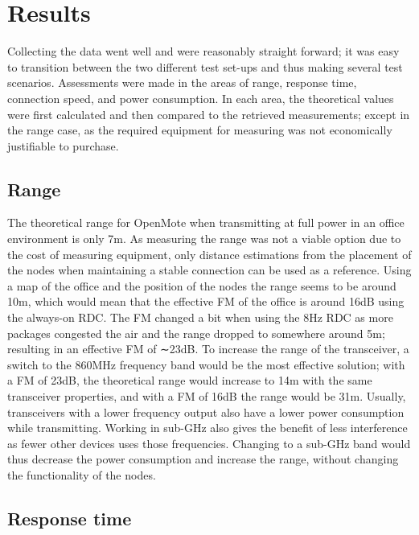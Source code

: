 \section{Results} \label{sec:Results}

Collecting the data went well and were reasonably straight forward;
	it was easy to transition between the two different test set-ups and thus making several test scenarios.
Assessments were made in the areas of range,
	response time,
	connection speed,
	and power consumption.
In each area,
	the theoretical values were first calculated and then compared to the retrieved measurements;
	except in the range case,
	as the required equipment for measuring was not economically justifiable to purchase.
	
\subsection{Range}

The theoretical range for OpenMote when transmitting at full power in an office environment is only 7m.
As measuring the range was not a viable option due to the cost of measuring equipment,
	only distance estimations from the placement of the nodes when maintaining a stable connection can be used as a reference.
Using a map of the office and the position of the nodes the range seems to be around 10m,
	which would mean that the effective FM of the office is around 16dB using the always-on RDC.
The FM changed a bit when using the 8Hz RDC as more packages congested the air and the range dropped to somewhere around 5m;
	resulting in an effective FM of ∼23dB.
To increase the range of the transceiver,
	a switch to the 860MHz frequency band would be the most effective solution;
	with a FM of 23dB,
	the theoretical range would increase to 14m with the same transceiver properties,
	and with a FM of 16dB the range would be 31m.
Usually,
	transceivers with a lower frequency output also have a lower power consumption while transmitting.
Working in sub-GHz also gives the benefit of less interference as fewer other devices uses those frequencies.
Changing to a sub-GHz band would thus decrease the power consumption and increase the range,
	without changing the functionality of the nodes.

\subsection{Response time}

